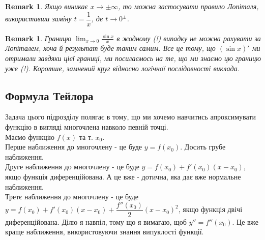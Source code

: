 \documentclass[a4paper, 14pt]{article}
\theoremstyle{theoremdd}
\theoremstyle{theoremdd}
\theoremstyle{theoremdd}
\theoremstyle{theoremdd}
\theoremstyle{theoremdd}
\theoremstyle{theoremdd}
\newtheorem{remark}[theorem]{Remark}
\theoremstyle{theoremdd}
\theoremstyle{theoremdd}
\begin{document}
\begin{remark}
Якщо виникає $x \to \pm \infty$, то можна застосувати правило Лопіталя, використавши заміну $t = \dfrac{1}{x}$, де $t \to 0^{\pm}$.
\end{remark}

\begin{remark}
Границю $\displaystyle \lim_{x \to 0} \frac{\sin x}{x}$ в жодному (!) випадку не можна рахувати за Лопіталем, хоча й результат буде таким самим. Все це тому, що $(\sin x)'$ ми отримали завдяки цієї границі, ми посилаємось на те, що ми знаємо цю границю уже (!). Коротше, замнений круг відносно логічної послідовності виклада.
\end{remark}

\subsection{Формула Тейлора}
Задача цього підрозділу полягає в тому, що ми хочемо навчитись апроксимувати функцію в вигляді многочлена навколо певній точці.\\
Маємо функцію $f(x)$ та т. $x_0$.\\
Перше наближення до многочлену - це буде $y = f(x_0)$. Досить грубе наближення.\\
Друге наближення до многочлену - це буде $y = f(x_0) + f'(x_0)(x-x_0)$, якщо функція диференційована. А це вже - дотична, яка дає вже нормальне наближення.\\
Третє наближення до многочлену - це буде $y = f(x_0) + f'(x_0)(x-x_0) + \dfrac{f''(x_0)}{2}(x-x_0)^2$, якщо функція двічі диференційована. Ділю я навпіл, тому що я вимагаю, щоб $y''=f''(x_0)$. Це вже краще наближення, використовуючи знання випуклості функції.\\
\end{document}

